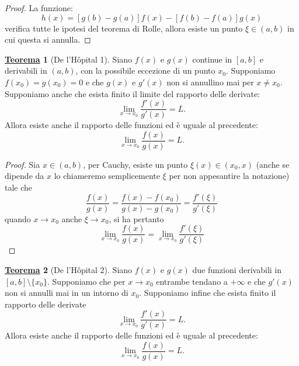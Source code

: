 \documentclass[a4paper,twoside]{article}
\theoremstyle{definition}
\newtheorem{theorem}{\color{Red}\underline{\textrm Teorema}}
\numberwithin{theorem}{section}
\begin{document}
\begin{proof}
    La funzione: $$h(x)=[g(b)-g(a)]f(x)-[f(b)-f(a)]g(x)$$ verifica tutte le ipotesi del teorema di Rolle, allora esiste un punto $\xi\in(a,b)$ in cui questa si annulla. 
\end{proof}
\begin{theorem}[De l'H\^opital 1]
    Siano $f(x)$ e $g(x)$ continue in $[a,b]$ e derivabili in $(a,b)$, con la possibile eccezione di un punto $x_0$. Supponiamo $f(x_0)=g(x_0)=0$ e che $g(x)$ e $g'(x)$ non si annullino mai per  $x\neq x_0$. Supponiamo anche che esista finito il limite del rapporto delle derivate: $$\lim_{x\to x_0}\frac{f'(x)}{g'(x)}=L.$$ Allora esiste anche il rapporto delle funzioni ed è uguale al precedente: $$\lim_{x\to x_0}\frac{f(x)}{g(x)}=L.$$ 
\end{theorem}
\begin{proof}
    Sia $x\in(a,b)$, per Cauchy, esiste un punto $\xi(x)\in(x_0,x)$ (anche se dipende da $x$ lo chiameremo semplicemente $\xi$ per non appesantire la notazione) tale che $$\frac{f(x)}{g(x)}=\frac{f(x)-f(x_0)}{g(x)-g(x_0)}=\frac{f'(\xi)}{g'(\xi)}$$ quando $x\to x_0$ anche $\xi\to x_0$, si ha pertanto $$\lim_{x\to x_0}\frac{f(x)}{g(x)}=\lim_{x\to x_0}\frac{f'(\xi)}{g'(\xi)}$$
\end{proof}
\begin{theorem}[De l'H\^opital 2]
    Siano $f(x)$ e $g(x)$ due funzioni derivabili in $[a,b]\setminus\{x_0\}$. Supponiamo che per $x\to x_0$ entrambe tendano a $+\infty$ e che $g'(x)$ non si annulli mai in un intorno di $x_0$. Supponiamo infine che esista finito il rapporto delle derivate $$\lim_{x\to x_0}\frac{f'(x)}{g'(x)}=L.$$
    Allora esiste anche il rapporto delle funzioni ed è uguale al precedente: $$\lim_{x\to x_0}\frac{f(x)}{g(x)}=L.$$
\end{theorem}
\end{document}
